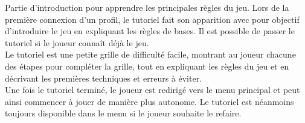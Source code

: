 {
	Partie d'introduction pour apprendre les principales règles du jeu.
}
{
    Lors de la première connexion d'un profil, le tutoriel fait son apparition avec pour objectif d'introduire le jeu en expliquant les règles de bases. Il est possible de passer le tutoriel si le joueur connaît déjà le jeu.
    \\
    Le tutoriel est une petite grille de difficulté facile, montrant au joueur chacune des étapes pour compléter la grille, tout en expliquant les règles du jeu et en décrivant les premières techniques et erreurs à éviter.
    \\
    Une fois le tutoriel terminé, le joueur est redirigé vers le menu principal et peut ainsi commencer à jouer de manière plus autonome. Le tutoriel est néanmoins toujours disponible dans le menu si le joueur souhaite le refaire.
}